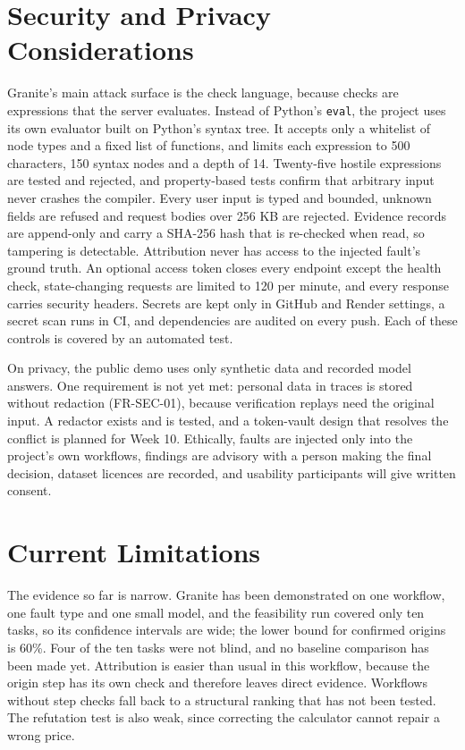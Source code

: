 \documentclass{fast-nuces-bs}
\begin{document}
\section{Security and Privacy Considerations}

Granite's main attack surface is the check language, because checks are expressions that the server evaluates. Instead of Python's \texttt{eval}, the project uses its own evaluator built on Python's syntax tree. It accepts only a whitelist of node types and a fixed list of functions, and limits each expression to 500 characters, 150 syntax nodes and a depth of 14. Twenty-five hostile expressions are tested and rejected, and property-based tests confirm that arbitrary input never crashes the compiler. Every user input is typed and bounded, unknown fields are refused and request bodies over 256 KB are rejected. Evidence records are append-only and carry a SHA-256 hash that is re-checked when read, so tampering is detectable. Attribution never has access to the injected fault's ground truth. An optional access token closes every endpoint except the health check, state-changing requests are limited to 120 per minute, and every response carries security headers. Secrets are kept only in GitHub and Render settings, a secret scan runs in CI, and dependencies are audited on every push. Each of these controls is covered by an automated test.

On privacy, the public demo uses only synthetic data and recorded model answers. One requirement is not yet met: personal data in traces is stored without redaction (FR-SEC-01), because verification replays need the original input. A redactor exists and is tested, and a token-vault design that resolves the conflict is planned for Week 10. Ethically, faults are injected only into the project's own workflows, findings are advisory with a person making the final decision, dataset licences are recorded, and usability participants will give written consent.

\section{Current Limitations}

The evidence so far is narrow. Granite has been demonstrated on one workflow, one fault type and one small model, and the feasibility run covered only ten tasks, so its confidence intervals are wide; the lower bound for confirmed origins is 60\%. Four of the ten tasks were not blind, and no baseline comparison has been made yet. Attribution is easier than usual in this workflow, because the origin step has its own check and therefore leaves direct evidence. Workflows without step checks fall back to a structural ranking that has not been tested. The refutation test is also weak, since correcting the calculator cannot repair a wrong price.
\end{document}
